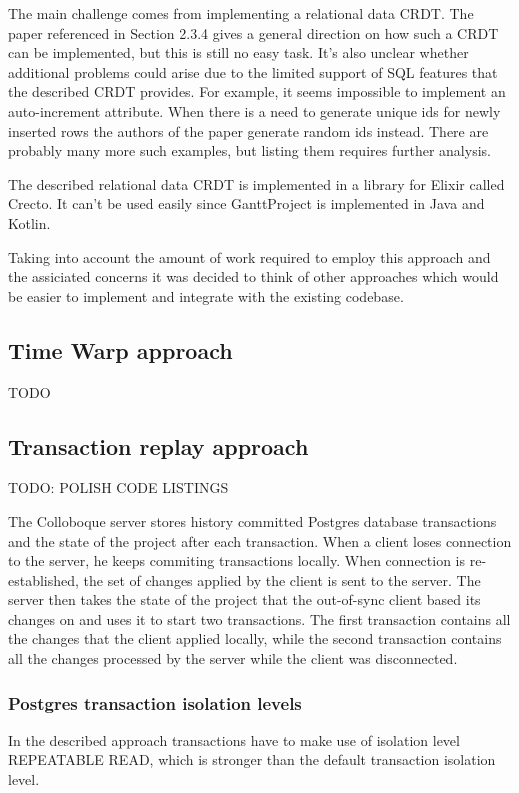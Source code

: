 \documentclass[a4paper, 11pt, oneside]{article}
\theoremstyle{definition}
\begin{document}
The main challenge comes from implementing a relational data CRDT. The paper referenced in Section 2.3.4 gives a general direction on how such a CRDT can be implemented, but this is still no easy task. It's also unclear whether additional problems could arise due to the limited support of SQL features that the described CRDT provides. For example, it seems impossible to implement an auto-increment attribute. When there is a need to generate unique ids for newly inserted rows the authors of the paper generate random ids instead. There are probably many more such examples, but listing them requires further analysis. 

The described relational data CRDT is implemented in a library for Elixir called Crecto. It can't be used easily since GanttProject is implemented in Java and Kotlin. 

Taking into account the amount of work required to employ this approach and the assiciated concerns it was decided to think of other approaches which would be easier to implement and integrate with the existing codebase.


\subsection{Time Warp approach}
TODO
\subsection{Transaction replay approach}
TODO: POLISH CODE LISTINGS

The Colloboque server stores history committed Postgres database transactions and the state of the project after each transaction. When a client loses connection to the server, he keeps commiting transactions locally. When connection is re-established, the set of changes applied by the client is sent to the server. The server then takes the state of the project that the out-of-sync client based its changes on and uses it to start two transactions. The first transaction contains all the changes that the client applied locally, while the second transaction contains all the changes processed by the server while the client was disconnected. 

\subsubsection{Postgres transaction isolation levels} 
In the described approach transactions have to make use of isolation level REPEATABLE READ, which is stronger than the default transaction isolation level.
\end{document}
